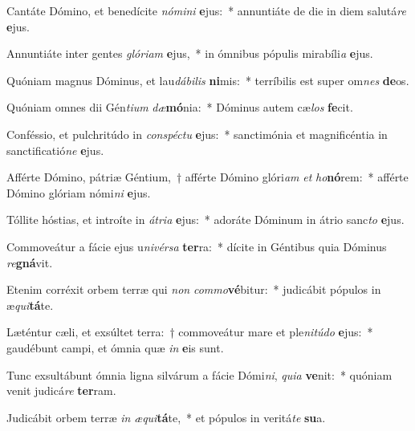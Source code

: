 \item Cantáte Dómino, et benedícite \textit{nó}\textit{mi}\textit{ni} \textbf{e}jus:~* annuntiáte de die in diem salutá\textit{re} \textbf{e}jus.
\item Annuntiáte inter gentes \textit{gló}\textit{ri}\textit{am} \textbf{e}jus,~* in ómnibus pópulis mirabíli\textit{a} \textbf{e}jus.
\item Quóniam magnus Dóminus, et lau\textit{dá}\textit{bi}\textit{lis} \textbf{ni}mis:~* terríbilis est super om\textit{nes} \textbf{de}os.
\item Quóniam omnes dii Gén\textit{ti}\textit{um} \textit{dæ}\textbf{mó}nia:~* Dóminus autem cæ\textit{los} \textbf{fe}cit.
\item Conféssio, et pulchritúdo in \textit{con}\textit{spéc}\textit{tu} \textbf{e}jus:~* sanctimónia et magnificéntia in sanctificatió\textit{ne} \textbf{e}jus.
\item Afférte Dómino, pátriæ Géntium,~† afférte Dómino glóri\textit{am} \textit{et} \textit{ho}\textbf{nó}rem:~* afférte Dómino glóriam nómi\textit{ni} \textbf{e}jus.
\item Tóllite hóstias, et introíte in \textit{á}\textit{tri}\textit{a} \textbf{e}jus:~* adoráte Dóminum in átrio sanc\textit{to} \textbf{e}jus.
\item Commoveátur a fácie ejus u\textit{ni}\textit{vér}\textit{sa} \textbf{ter}ra:~* dícite in Géntibus quia Dóminus \textit{re}\textbf{gná}vit.
\item Etenim corréxit orbem terræ qui \textit{non} \textit{com}\textit{mo}\textbf{vé}bitur:~* judicábit pópulos in æ\textit{qui}\textbf{tá}te.
\item Læténtur cæli, et exsúltet terra:~† commoveátur mare et ple\textit{ni}\textit{tú}\textit{do} \textbf{e}jus:~* gaudébunt campi, et ómnia quæ \textit{in} \textbf{e}is sunt.
\item Tunc exsultábunt ómnia ligna silvárum a fácie Dómi\textit{ni}, \textit{qui}\textit{a} \textbf{ve}nit:~* quóniam venit judicá\textit{re} \textbf{ter}ram.
\item Judicábit orbem terræ \textit{in} \textit{æ}\textit{qui}\textbf{tá}te,~* et pópulos in veritá\textit{te} \textbf{su}a.
